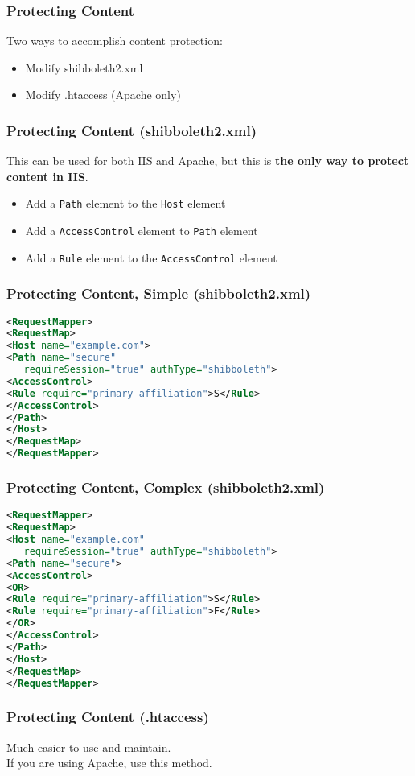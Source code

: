 \begin{frame}
\frametitle{Protecting Content}
Two ways to accomplish content protection:
\begin{itemize}
\item Modify shibboleth2.xml
\item Modify .htaccess (Apache only)
\end{itemize}
\end{frame}

\begin{frame}
\frametitle{Protecting Content (shibboleth2.xml)}
This can be used for both IIS and Apache, but this is \textbf{the only way to protect content in IIS}.
\begin{itemize}
\item Add a \texttt{Path} element to the \texttt{Host} element 
\item Add a \texttt{AccessControl} element to \texttt{Path} element
\item Add a \texttt{Rule} element to the \texttt{AccessControl} element
\end{itemize}
\end{frame}

\begin{frame}[fragile]
\frametitle{Protecting Content, Simple (shibboleth2.xml)}
\begin{lstlisting}[language=XML,basicstyle=\ttfamily \small]
<RequestMapper>
<RequestMap>
<Host name="example.com">
<Path name="secure" 
   requireSession="true" authType="shibboleth">
<AccessControl>
<Rule require="primary-affiliation">S</Rule>
</AccessControl>
</Path>
</Host>
</RequestMap>
</RequestMapper>
\end{lstlisting}

\end{frame}

\begin{frame}[fragile]
\frametitle{Protecting Content, Complex (shibboleth2.xml)}
\begin{lstlisting}[language=XML,basicstyle=\ttfamily \small]
<RequestMapper>
<RequestMap>
<Host name="example.com" 
   requireSession="true" authType="shibboleth">
<Path name="secure">
<AccessControl>
<OR>
<Rule require="primary-affiliation">S</Rule>
<Rule require="primary-affiliation">F</Rule>
</OR>
</AccessControl>
</Path>
</Host>
</RequestMap>
</RequestMapper>
\end{lstlisting}

\end{frame}

\begin{frame}
\frametitle{Protecting Content (.htaccess)}
Much easier to use and maintain. \\ \bigskip
If you are using Apache, use this method.
\end{frame}

